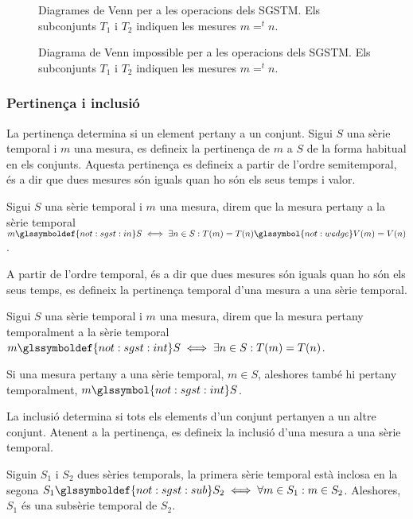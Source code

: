 \begin{figure}[tp]
  \centering
  
  \caption{Diagrames de Venn per a les operacions dels \gls{SGSTM}. Els
    subconjunts $T_1$ i $T_2$ indiquen les mesures $m =^t n$.}
  \label{fig:model:sgst:venn}
\end{figure}


\begin{figure}[tp]
  \centering
  
  \caption{Diagrama de Venn impossible per a les operacions dels
    \gls{SGSTM}. Els subconjunts $T_1$ i $T_2$ indiquen les mesures
    $m =^t n$.}
  \label{fig:model:sgst:venn-impossible}
\end{figure}


\subsubsection{Pertinença i inclusió}


La pertinença determina si un element pertany a un conjunt.  Sigui $S$
una sèrie temporal i $m$ una mesura, es defineix la pertinença de $m$
a $S$ de la forma habitual en els conjunts. Aquesta pertinença es
defineix a partir de l'ordre semitemporal, és a dir que dues mesures
són iguals quan ho són els seus temps i valor.
\begin{definition}[Pertinença]
  Sigui $S$ una sèrie temporal i $m$ una
  mesura, direm que la mesura pertany a la sèrie temporal
  $m \glssymboldef{not:sgst:in} S \iff \exists n \in S :
  T(m) = T(n) \glssymbol{not:wedge} V(m) = V(n)$.
\end{definition}




A partir de l'ordre temporal, és a dir que dues mesures són iguals quan
ho són els seus temps, es defineix la pertinença temporal d'una mesura
a una sèrie temporal.
\begin{definition}
  Sigui $S$ una sèrie temporal i $m$ una
  mesura, direm que la mesura pertany temporalment a la sèrie temporal
  $m \glssymboldef{not:sgst:int} S \iff \exists n \in S :
  T(m) = T(n)$.
\end{definition}


Si una mesura pertany a una sèrie temporal, $m\in S$, aleshores també
hi pertany temporalment, $m \glssymbol{not:sgst:int} S$.



La inclusió determina si tots els elements d'un conjunt pertanyen a un
altre conjunt. Atenent a la pertinença, es defineix la inclusió d'una
mesura a una sèrie temporal.
\begin{definition}[Inclusió]
  Siguin $S_1$ i $S_2$
  dues sèries temporals, la primera sèrie temporal està inclosa en la
  segona $S_1 \glssymboldef{not:sgst:sub} S_2 \iff \forall
  m \in S_1: m \in S_2$. Aleshores, $S_1$ és una subsèrie temporal de
  $S_2$.
\end{definition}




